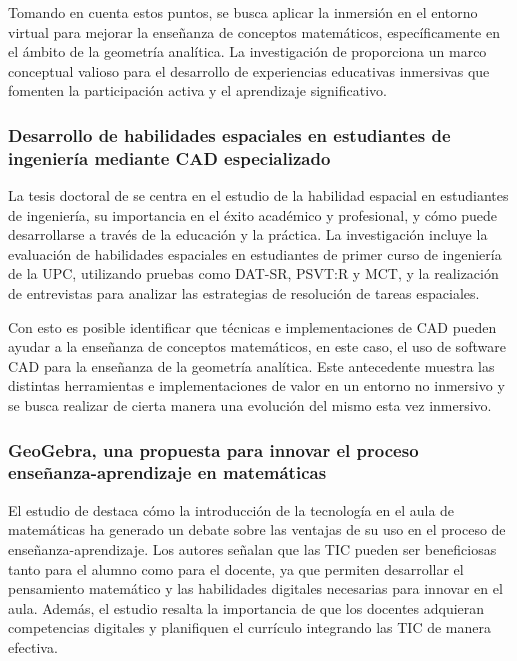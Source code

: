 Tomando en cuenta estos puntos, se busca aplicar la inmersión en el entorno virtual para mejorar la enseñanza de conceptos matemáticos, específicamente en el ámbito de la geometría analítica. La investigación de \citeauthor{dede2009immersive} proporciona un marco conceptual valioso para el desarrollo de experiencias educativas inmersivas que fomenten la participación activa y el aprendizaje significativo.

\subsubsection*{Desarrollo de habilidades espaciales en estudiantes de ingeniería mediante CAD especializado}
La tesis doctoral de \citeauthor{tristancho2019desarrollo} \citeyear{tristancho2019desarrollo} se centra en el estudio de la habilidad espacial en estudiantes de ingeniería, su importancia en el éxito académico y profesional, y cómo puede desarrollarse a través de la educación y la práctica. La investigación incluye la evaluación de habilidades espaciales en estudiantes de primer curso de ingeniería de la UPC, utilizando pruebas como DAT-SR, PSVT:R y MCT, y la realización de entrevistas para analizar las estrategias de resolución de tareas espaciales.

Con esto es posible identificar que técnicas e implementaciones de CAD pueden ayudar a la enseñanza de conceptos matemáticos, en este caso, el uso de software CAD para la enseñanza de la geometría analítica. Este antecedente muestra las distintas herramientas e implementaciones de valor en un entorno no inmersivo y se busca realizar de cierta manera una evolución del mismo esta vez inmersivo.

\subsubsection*{GeoGebra, una propuesta para innovar el proceso enseñanza-aprendizaje en matemáticas}
El estudio de \citeauthor{garcia2017geogebra} \citeyear{garcia2017geogebra} destaca cómo la introducción de la tecnología en el aula de matemáticas ha generado un debate sobre las ventajas de su uso en el proceso de enseñanza-aprendizaje. Los autores señalan que las TIC pueden ser beneficiosas tanto para el alumno como para el docente, ya que permiten desarrollar el pensamiento matemático y las habilidades digitales necesarias para innovar en el aula. Además, el estudio resalta la importancia de que los docentes adquieran competencias digitales y planifiquen el currículo integrando las TIC de manera efectiva.

